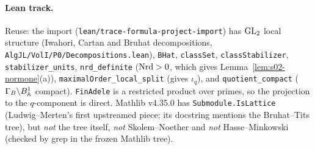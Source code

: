 \paragraph{Lean track.}
Reuse: the import (\texttt{lean/trace-formula-project-import}) has $\mathrm{GL}_2$ local structure (Iwahori, Cartan and
Bruhat decompositions, \texttt{AlgJL/VolI/P0/Decompositions.lean}), \texttt{BHat}, \texttt{classSet},
\texttt{classStabilizer}, \texttt{stabilizer\_units}, \texttt{nrd\_definite} ($\mathrm{Nrd}>0$, which gives
Lemma~\ref{lem:s02-normone}(a)), \texttt{maximalOrder\_local\_split} (gives $\iota_q$), and \texttt{quotient\_compact}
($\Gamma_B\backslash B_{\mathbb{A}}^1$ compact). \texttt{FinAdele} is a restricted product over primes, so the projection to
the $q$-component is direct. Mathlib v4.35.0 has \texttt{Submodule.IsLattice} (Ludwig--Merten's first upstreamed
piece; its docstring mentions the Bruhat--Tits tree), but \emph{not} the tree itself, \emph{not} Skolem--Noether
and \emph{not} Hasse--Minkowski (checked by grep in the frozen Mathlib tree).
